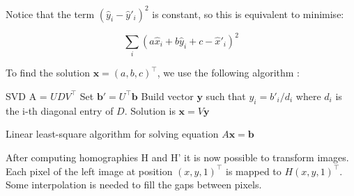 \documentclass[11pt]{report}
\begin{document}
Notice that the term $(\hat{y}_i - \hat{y}'_i)^2$ is constant, so this is equivalent to minimise:

\begin{equation}
    \sum_i (a\hat{x}_i + b\hat{y}_i + c - \hat{x}'_i)^2
    \label{eq:alignment3}
\end{equation}

To find the solution $\mathbf{x} = (a, b, c)^\top$, we use the following algorithm :
\begin{algorithm}[H]
    SVD A = $UDV^\top$\;
    Set $\mathbf{b}' = U^\top\mathbf{b}$\;
    Build vector $\mathbf{y}$ such that $y_i = b'_i/d_i$ where $d_i$ is the i-th diagonal entry of $D$.\;
    Solution is $\mathbf{x} = V\mathbf{y}$\;
    \caption{Linear least-square algorithm for solving equation $A\mathbf{x} = \mathbf{b}$}
    \label{algo:leastsquare1}
\end{algorithm}

After computing homographies H and H' it is now possible to transform images. Each pixel of the left image at position $(x, y, 1)^\top$ is mapped to $H(x, y, 1)^\top$. Some interpolation is needed to fill the gaps between pixels.
\end{document}
